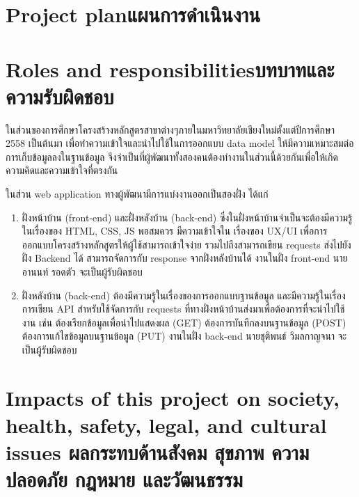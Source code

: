 \section{\ifenglish Project plan\else แผนการดำเนินงาน\fi}


\section{\ifenglish Roles and responsibilities\else บทบาทและความรับผิดชอบ\fi}

ในส่วนของการศึกษาโครงสร้างหลักสูตรสาขาต่างๆภายในมหาวิทยาลัยเชียงใหม่ตั้งแต่ปีการศึกษา 2558 เป็นต้นมา เพื่อทำความเข้าใจและนําไปใช้ในการออกแบบ data model ให้มีความเหมาะสมต่อการเก็บข้อมูลลงในฐานข้อมูล จึงจำเป็นที่ผู้พัฒนาทั้งสองคนต้องทำงานในส่วนนี้ด้วยกันเพื่อให้เกิดความคิดและความเข้าใจที่ตรงกัน 
	
ในส่วน web application ทางผู้พัฒนามีการแบ่งงานออกเป็นสองฝั่ง ได้แก่ 

\begin{enumerate}
    
    \item ฝั่งหน้าบ้าน (front-end) และฝั่งหลังบ้าน (back-end) ซึ่งในฝั่งหน้าบ้านจําเป็นจะต้องมีความรู้ในเรื่องของ HTML, CSS, JS พอสมควร มีความเข้าใจใน เรื่องของ UX/UI เพื่อการออกแบบโครงสร้างหลักสูตรให้ผู้ใช้สามารถเข้าใจง่าย รวมไปถึงสามารถเขียน requests ส่งไปยังฝั่ง Backend ได้ สามารถจัดการกับ response จากฝั่งหลังบ้านได้ งานในฝั่ง front-end นายอานนท์ รอดตัว จะเป็นผู้รับผิดชอบ
    \item ฝั่งหลังบ้าน (back-end) ต้องมีความรู้ในเรื่องของการออกแบบฐานข้อมูล และมีความรู้ในเรื่องการเขียน API สําหรับใช้จัดการกับ requests ที่ทางฝั่งหน้าบ้านส่งมาเพื่อต้องการที่จะนําไปใช้งาน เช่น ต้องเรียกข้อมูลเพื่อนำไปแสดงผล (GET) ต้องการบันทึกลงบนฐานข้อมูล (POST) ต้องการแก้ไขข้อมูลบนฐานข้อมูล (PUT) งานในฝั่ง back-end นายชุติพนธ์ วิมลกาญจนา จะเป็นผู้รับผิดชอบ

\end{enumerate}

\section{\ifenglish%
Impacts of this project on society, health, safety, legal, and cultural issues
\else%
ผลกระทบด้านสังคม สุขภาพ ความปลอดภัย กฎหมาย และวัฒนธรรม
\fi}

